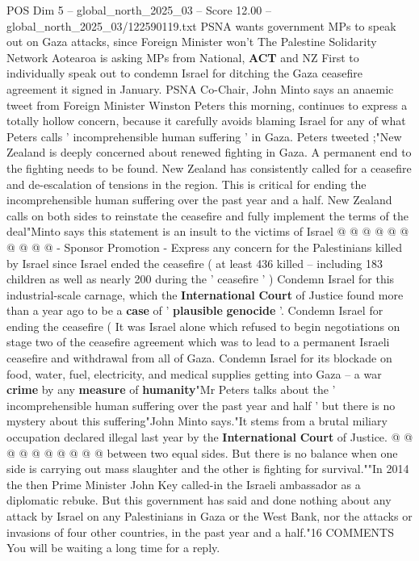 \begin{textsample}{POS Dim 5 – global\_north\_2025\_03 – Score 12.00 – global\_north\_2025\_03/122590119.txt}  \label{ex:f5_pos_210}
PSNA wants government MPs to speak out on Gaza attacks, since Foreign Minister won't The Palestine Solidarity Network Aotearoa is asking MPs from National, \textbf{ACT} and NZ First to individually speak out to condemn Israel for ditching the Gaza ceasefire agreement it signed in January.
PSNA Co-Chair, John Minto says an anaemic tweet from Foreign Minister Winston Peters this morning, continues to express a totally hollow concern, because it carefully avoids blaming Israel for any of what Peters calls ' incomprehensible human suffering ' in Gaza.
Peters tweeted ;"New Zealand is deeply concerned about renewed fighting in Gaza.
A permanent end to the fighting needs to be found.
New Zealand has consistently called for a ceasefire and de-escalation of tensions in the region.
This is critical for ending the incomprehensible human suffering over the past year and a half.
New Zealand calls on both sides to reinstate the ceasefire and fully implement the terms of the deal"Minto says this statement is an insult to the victims of Israel @ @ @ @ @ @ @ @ @ @ - Sponsor Promotion - Express any concern for the Palestinians killed by Israel since Israel ended the ceasefire ( at least 436 killed -- including 183 children as well as nearly 200 during the ' ceasefire ' ) Condemn Israel for this industrial-scale carnage, which the \textbf{International} \textbf{Court} of Justice found more than a year ago to be a \textbf{case} of ' \textbf{plausible} \textbf{genocide} '.
Condemn Israel for ending the ceasefire ( It was Israel alone which refused to begin negotiations on stage two of the ceasefire agreement which was to lead to a permanent Israeli ceasefire and withdrawal from all of Gaza.
Condemn Israel for its blockade on food, water, fuel, electricity, and medical supplies getting into Gaza -- a war \textbf{crime} by any \textbf{measure} of \textbf{humanity}"Mr Peters talks about the ' incomprehensible human suffering over the past year and half ' but there is no mystery about this suffering"John Minto says."It stems from a brutal miliary occupation declared illegal last year by the \textbf{International} \textbf{Court} of Justice. @ @ @ @ @ @ @ @ @ @ between two equal sides.
But there is no balance when one side is carrying out mass slaughter and the other is fighting for survival.""In 2014 the then Prime Minister John Key called-in the Israeli ambassador as a diplomatic rebuke.
But this government has said and done nothing about any attack by Israel on any Palestinians in Gaza or the West Bank, nor the attacks or invasions of four other countries, in the past year and a half."16 COMMENTS You will be waiting a long time for a reply.

\end{textsample}
